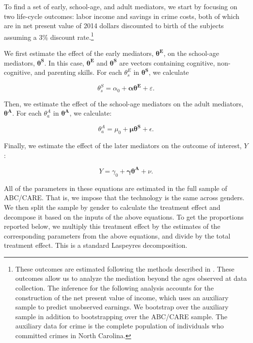 To find a set of early, school-age, and adult mediators, we start by focusing on two life-cycle outcomes: labor income and savings in crime costs, both of which are in net present value of 2014 dollars discounted to birth of the subjects assuming a 3\% discount rate.\footnote{These outcomes are estimated following the methods described in \citet{Garcia_etal_2016_Comp_CBA_Unpublished}. These outcomes allow us to analyze the mediation beyond the ages observed at data collection. The inference for the following analysis accounts for the construction of the net present value of income, which uses an auxiliary sample to predict unobserved earnings. We bootstrap over the auxiliary sample in addition to bootstrapping over the ABC/CARE sample. The auxiliary data for crime is the complete population of individuals who committed crimes in North Carolina.}

We first estimate the effect of the early mediators, $\bm{\theta^E}$, on the school-age mediators, $\bm{\theta^S}$. In this case, $\bm{\theta^E}$ and $\bm{\theta^S}$ are vectors containing cognitive, non-cognitive, and parenting skills. For each $\theta^E_s$ in $\bm{\theta^S}$, we calculate

\begin{equation}
	\theta^S_s = \alpha_0 +\bm{ \alpha} \bm{\theta^E} + \varepsilon.
\end{equation}

Then, we estimate the effect of the school-age mediators on the adult mediators, $\bm{\theta^A}$. For each $\theta^A_a$ in $\bm{\theta^A}$, we calculate:

\begin{equation}
	\theta^A_a = \mu_0 + \bm{\mu} \bm{\theta^S} + \epsilon.
\end{equation}

Finally, we estimate the effect of the later mediators on the outcome of interest, $Y$:

\begin{equation}
	Y = \gamma_0 +\bm{\gamma} \bm{\theta^A} + \nu. 
\end{equation}

All of the parameters in these equations are estimated in the full sample of ABC/CARE. That is, we impose that the technology is the same across genders. We then split the sample by gender to calculate the treatment effect and decompose it based on the inputs of the above equations. To get the proportions reported below, we multiply this treatment effect by the estimates of the corresponding parameters from the above equations, and divide by the total treatment effect. This is a standard Laspeyres decomposition.


